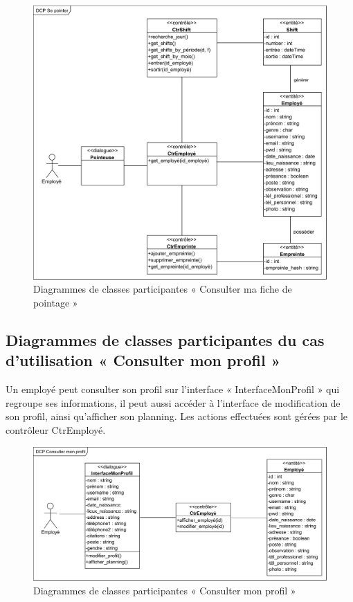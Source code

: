 \begin{figure}[h!]
    \centering
    \includegraphics[scale=0.84]{images/DCP/DCP Se pointer.png}
    \caption{Diagrammes de classes participantes « Consulter ma fiche de pointage »}
    \label{fig24}
\end{figure}
            
\subsection*{Diagrammes de classes participantes du cas d'utilisation « Consulter mon profil »}
Un employé peut consulter son profil sur l’interface « InterfaceMonProfil » qui 
regroupe ses informations, il peut aussi accéder à l’interface de modification 
de son profil, ainsi qu’afficher son planning. Les actions effectuées sont 
gérées par le contrôleur CtrEmployé.  

\begin{figure}[h!]
    \centering
    \includegraphics[scale=0.7]{images/DCP/DCP consulter_mon_profil.png}
    \caption{Diagrammes de classes participantes « Consulter mon profil »}
    \label{fig25}
\end{figure}
        
